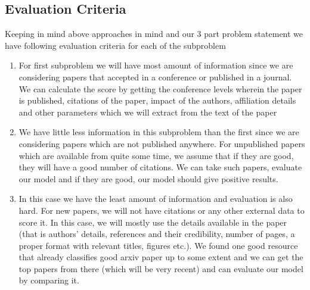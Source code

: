 \documentclass[a4paper, 11pt]{article}
\begin{document}
\subsection{Evaluation Criteria}
Keeping in mind above approaches in mind and our 3 part problem statement we have following evaluation criteria for each of the subproblem
\begin{enumerate}
\item  For first subproblem we will have most amount of information since we are considering papers that accepted in a conference or published in a journal. We can calculate the score by getting the conference levels wherein the paper is published, citations of the paper, impact of the authors, affiliation details and other parameters which we will extract from the text of the paper

\item We have little less information in this subproblem than the first since we are considering papers which are not published anywhere. For unpublished papers which are available from quite some time, we assume that if they are good, they will have a good number of citations. We can take such papers, evaluate our model and if they are good, our model should give positive results.

\item In this case we have the least amount of information and evaluation is also hard. For new papers, we will not have citations or any other external data to score it. In this case, we will mostly use the details available in the paper (that is authors' details, references and their credibility, number of pages, a proper format with relevant titles, figures etc.). We found one good resource \cite{scirate}  that already classifies good arxiv paper up to some extent and we can get the top papers from there (which will be very recent) and can evaluate our model by comparing it.
\end{enumerate}
\end{document}
